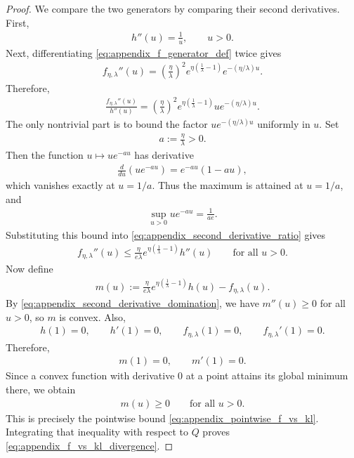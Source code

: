 \begin{proof}
We compare the two generators by comparing their second derivatives.
First,
\begin{align*}
    h''(u) = \frac{1}{u},
    \qquad u>0.
\end{align*}
Next, differentiating \eqref{eq:appendix_f_generator_def} twice gives
\begin{align*}
    f_{\eta,\lambda}''(u)
    = \left(\frac{\eta}{\lambda}\right)^2 e^{\eta(\frac{1}{\lambda}-1)} e^{-(\eta/\lambda)u}.
\end{align*}
Therefore,
\begin{align}
    \frac{f_{\eta,\lambda}''(u)}{h''(u)}
    = \left(\frac{\eta}{\lambda}\right)^2 e^{\eta(\frac{1}{\lambda}-1)} u e^{-(\eta/\lambda)u}.
    \label{eq:appendix_second_derivative_ratio}
\end{align}
The only nontrivial part is to bound the factor $u e^{-(\eta/\lambda)u}$ uniformly in $u$.
Set
\begin{align*}
    a := \frac{\eta}{\lambda} > 0.
\end{align*}
Then the function $u \mapsto ue^{-au}$ has derivative
\begin{align*}
    \frac{d}{du}\left(ue^{-au}\right) = e^{-au}(1-au),
\end{align*}
which vanishes exactly at $u = 1/a$.
Thus the maximum is attained at $u = 1/a$, and
\begin{align*}
    \sup_{u>0} ue^{-au}
    = \frac{1}{ae}.
\end{align*}
Substituting this bound into \eqref{eq:appendix_second_derivative_ratio} gives
\begin{align}
    f_{\eta,\lambda}''(u)
    \leq
    \frac{\eta}{e\lambda}e^{\eta(\frac{1}{\lambda}-1)} h''(u)
    \qquad \text{for all } u>0.
    \label{eq:appendix_second_derivative_domination}
\end{align}
Now define
\begin{align*}
    m(u)
    := \frac{\eta}{e\lambda}e^{\eta(\frac{1}{\lambda}-1)} h(u) - f_{\eta,\lambda}(u).
\end{align*}
By \eqref{eq:appendix_second_derivative_domination}, we have $m''(u) \geq 0$ for all $u>0$, so $m$ is convex.
Also,
\begin{align*}
    h(1) = 0,
    \qquad h'(1) = 0,
    \qquad f_{\eta,\lambda}(1) = 0,
    \qquad f_{\eta,\lambda}'(1) = 0.
\end{align*}
Therefore,
\begin{align*}
    m(1) = 0,
    \qquad m'(1) = 0.
\end{align*}
Since a convex function with derivative $0$ at a point attains its global minimum there, we obtain
\begin{align*}
    m(u) \geq 0
    \qquad \text{for all } u>0.
\end{align*}
This is precisely the pointwise bound \eqref{eq:appendix_pointwise_f_vs_kl}. Integrating
that inequality with respect to $Q$ proves \eqref{eq:appendix_f_vs_kl_divergence}.
\end{proof}

